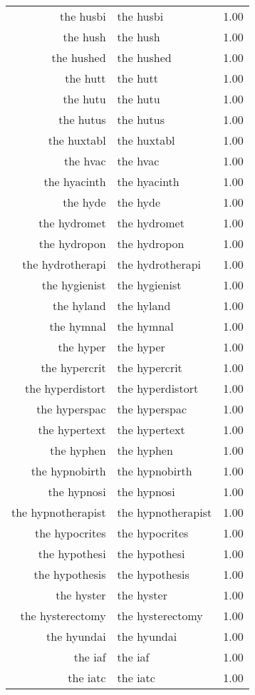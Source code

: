 \begin{table}[ht]
\begin{tabular}{rlr}
  the husbi & the husbi & 1.00 \\ 
  the hush & the hush & 1.00 \\ 
  the hushed & the hushed & 1.00 \\ 
  the hutt & the hutt & 1.00 \\ 
  the hutu & the hutu & 1.00 \\ 
  the hutus & the hutus & 1.00 \\ 
  the huxtabl & the huxtabl & 1.00 \\ 
  the hvac & the hvac & 1.00 \\ 
  the hyacinth & the hyacinth & 1.00 \\ 
  the hyde & the hyde & 1.00 \\ 
  the hydromet & the hydromet & 1.00 \\ 
  the hydropon & the hydropon & 1.00 \\ 
  the hydrotherapi & the hydrotherapi & 1.00 \\ 
  the hygienist & the hygienist & 1.00 \\ 
  the hyland & the hyland & 1.00 \\ 
  the hymnal & the hymnal & 1.00 \\ 
  the hyper & the hyper & 1.00 \\ 
  the hypercrit & the hypercrit & 1.00 \\ 
  the hyperdistort & the hyperdistort & 1.00 \\ 
  the hyperspac & the hyperspac & 1.00 \\ 
  the hypertext & the hypertext & 1.00 \\ 
  the hyphen & the hyphen & 1.00 \\ 
  the hypnobirth & the hypnobirth & 1.00 \\ 
  the hypnosi & the hypnosi & 1.00 \\ 
  the hypnotherapist & the hypnotherapist & 1.00 \\ 
  the hypocrites & the hypocrites & 1.00 \\ 
  the hypothesi & the hypothesi & 1.00 \\ 
  the hypothesis & the hypothesis & 1.00 \\ 
  the hyster & the hyster & 1.00 \\ 
  the hysterectomy & the hysterectomy & 1.00 \\ 
  the hyundai & the hyundai & 1.00 \\ 
  the iaf & the iaf & 1.00 \\ 
  the iatc & the iatc & 1.00 \\ 

\end{tabular}
\end{table}
